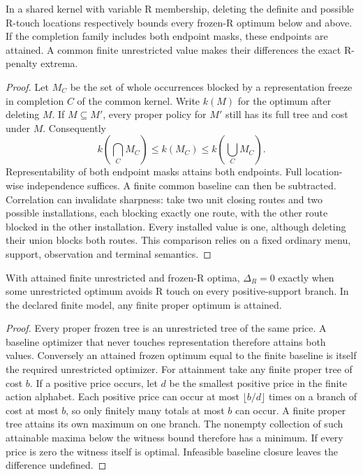 \begin{proposition}\label{found:p03}

In a shared kernel with variable R membership, deleting the definite and possible R-touch locations respectively bounds every frozen-R optimum below and above. If the completion family includes both endpoint masks, these endpoints are attained. A common finite unrestricted value makes their differences the exact R-penalty extrema.

\end{proposition}

\begin{proof}

Let \(M_C\) be the set of whole occurrences blocked by a representation freeze in completion \(C\) of the common kernel. Write \(k(M)\) for the optimum after deleting \(M\). If \(M\subseteq M'\), every proper policy for \(M'\) still has its full tree and cost under \(M\). Consequently
\[
k\!\left(\bigcap_C M_C\right)\le k(M_C)\le k\!\left(\bigcup_C M_C\right).
\]
Representability of both endpoint masks attains both endpoints. Full location-wise independence suffices. A finite common baseline can then be subtracted. Correlation can invalidate sharpness: take two unit closing routes and two possible installations, each blocking exactly one route, with the other route blocked in the other installation. Every installed value is one, although deleting their union blocks both routes. This comparison relies on a fixed ordinary menu, support, observation and terminal semantics.

\end{proof}

\begin{proposition}\label{found:p04}

With attained finite unrestricted and frozen-R optima, \(\Delta_R=0\) exactly when some unrestricted optimum avoids R touch on every positive-support branch. In the declared finite model, any finite proper optimum is attained.

\end{proposition}

\begin{proof}

Every proper frozen tree is an unrestricted tree of the same price. A baseline optimizer that never touches representation therefore attains both values. Conversely an attained frozen optimum equal to the finite baseline is itself the required unrestricted optimizer. For attainment take any finite proper tree of cost \(b\). If a positive price occurs, let \(d\) be the smallest positive price in the finite action alphabet. Each positive price can occur at most \(\lfloor b/d\rfloor\) times on a branch of cost at most \(b\), so only finitely many totals at most \(b\) can occur. A finite proper tree attains its own maximum on one branch. The nonempty collection of such attainable maxima below the witness bound therefore has a minimum. If every price is zero the witness itself is optimal. Infeasible baseline closure leaves the difference undefined.

\end{proof}

